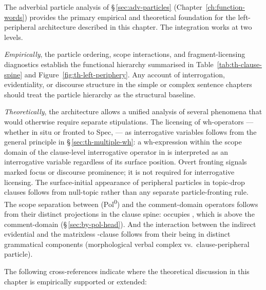 The adverbial particle analysis of §\,\ref{sec:adv-particles}
(Chapter~\ref{ch:function-words}) provides the primary empirical and
theoretical foundation for the left-peripheral architecture described in
this chapter. The integration works at two levels.

\emph{Empirically}, the particle ordering, scope interactions, and
fragment-licensing diagnostics establish the functional hierarchy
summarised in Table~\ref{tab:th-clause-spine} and
Figure~\ref{fig:th-left-periphery}. Any account of interrogation,
evidentiality, or discourse structure in the simple or complex sentence
chapters should treat the particle hierarchy as the structural baseline.

\emph{Theoretically}, the architecture allows a unified analysis of several
phenomena that would otherwise require separate stipulations. The licensing
of wh-operators --- whether in situ or fronted to Spec, --- as
interrogative variables follows from the general principle in
§\,\ref{sec:th-multiple-wh}: a wh-expression within the scope domain of the
clause-level interrogative operator in  is interpreted as an interrogative
variable regardless of its surface position. Overt fronting signals marked
focus or discourse prominence; it is not required for interrogative licensing.
The surface-initial appearance of peripheral particles in topic-drop clauses
follows from null-topic rather than any separate particle-fronting rule.
The scope separation between  (Pol\textsuperscript{0}) and the
comment-domain operators follows from their distinct projections in the clause
spine:  occupies , which is above the comment-domain
(§\,\ref{sec:by-pol-head}). And the interaction between the indirect evidential
and the matrixless -clause follows from their being in distinct
grammatical components (morphological verbal complex vs.\ clause-peripheral
particle).

The following cross-references indicate where the theoretical discussion in
this chapter is empirically supported or extended:

